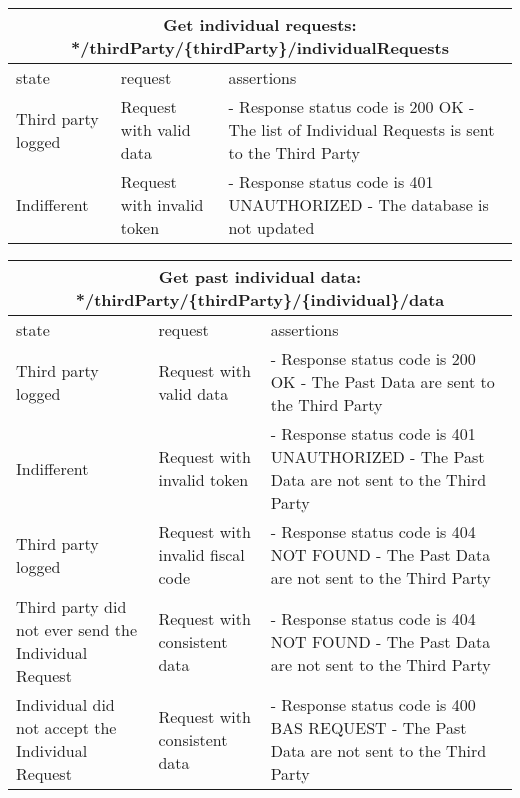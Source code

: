 \begin{center}
	\begin{tabular}{|p{}|p{}|p{}|}
		\hline
		\multicolumn{3}{c}{Get individual requests: */thirdParty/\{thirdParty\}/individualRequests}\\

		\hline
		state & request & assertions \\
		
		\hline
		Third party logged&
		Request with valid data & 
		- Response status code is 200 OK\newline
		- The list of Individual Requests is sent to the Third Party
		\\
		
		\hline
		Indifferent&
		Request with invalid token & 
		- Response status code is 401 UNAUTHORIZED \newline
		- The database is not updated
		\\
		\hline
	\end{tabular}
\end{center}

\begin{center}
	\begin{tabular}{|p{}|p{}|p{}|}
		\hline
		\multicolumn{3}{c}{Get past individual data: */thirdParty/\{thirdParty\}/\{individual\}/data}\\

		\hline
		state & request & assertions \\
		
		\hline
		Third party logged&
		Request with valid data & 
		- Response status code is 200 OK\newline
		- The Past Data are sent to the Third Party
		\\
		
		\hline
		Indifferent&
		Request with invalid token & 
		- Response status code is 401 UNAUTHORIZED \newline
		- The Past Data are not sent to the Third Party
		\\
		\hline
		Third party logged&
		Request with invalid fiscal code & 
		- Response status code is 404 NOT FOUND\newline
		- The Past Data are not sent to the Third Party
		\\
		\hline
		Third party did not ever send the Individual Request&
		Request with consistent data & 
		- Response status code is 404 NOT FOUND\newline
		- The Past Data are not sent to the Third Party
		\\
		Individual did not accept the Individual Request&
		Request with consistent data & 
		- Response status code is 400 BAS REQUEST\newline
		- The Past Data are not sent to the Third Party
		\\
		\hline
	\end{tabular}
\end{center}

